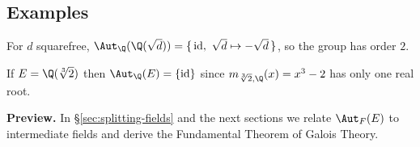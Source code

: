 \subsection{Examples}
\begin{example}[Quadratic]
For $d$ squarefree, $\Aut_\Q(\Q(\sqrt d))=\{\,\mathrm{id},\ \sqrt d\mapsto -\sqrt d\,\}$, so the group has order $2$.
\end{example}
\begin{example}
If $E=\Q(\root3\of 2)$ then $\Aut_\Q(E)=\{\mathrm{id}\}$ since $m_{\root3\of 2,\Q}(x)=x^3-2$ has only one real root.
\end{example}

\bigskip
\noindent\textbf{Preview.}
In \S\ref{sec:splitting-fields} and the next sections we relate $\Aut_F(E)$ to intermediate fields and derive the Fundamental Theorem of Galois Theory.

